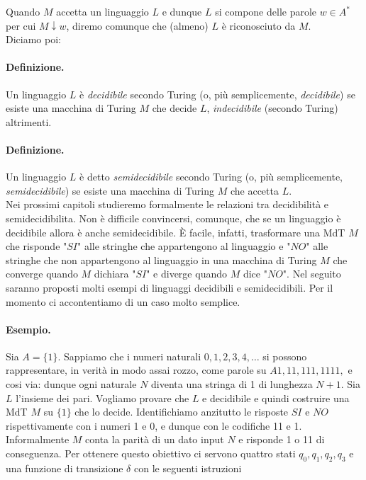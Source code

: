 Quando $M$ accetta un linguaggio $L$ e dunque $L$ si compone delle parole
$w \in A^*$ per cui $M \downarrow w$, diremo comunque che (almeno) $L$ è
riconosciuto da $M$.\\

Diciamo poi:

\paragraph{Definizione.}
Un linguaggio $L$ è \textit{decidibile} secondo Turing
(o, più semplicemente, \textit{decidibile}) se esiste una macchina di Turing $M$ che
decide $L$, \textit{indecidibile} (secondo Turing) altrimenti.

\paragraph{Definizione.}
Un linguaggio $L$ è detto \textit{semidecidibile} secondo Turing
(o, più semplicemente, \textit{semidecidibile}) se esiste una macchina di Turing
$M$ che accetta $L$.\\

Nei prossimi capitoli studieremo formalmente le relazioni tra decidibilità e
semidecidibilita. Non è difficile convincersi, comunque, che se un linguaggio è
decidibile allora è anche semidecidibile. È facile, infatti, trasformare una MdT
$M$ che risponde "$SI$" alle stringhe che appartengono al linguaggio e
"$NO$" alle stringhe che non appartengono al linguaggio in una macchina di Turing
$M$ che converge quando $M$ dichiara "$SI$" e diverge quando $M$ dice "$NO$".
Nel seguito saranno proposti molti esempi di linguaggi decidibili e semidecidibili.
Per il momento ci accontentiamo di un caso molto semplice.

\paragraph{Esempio.}
Sia $A = \{1\}$. Sappiamo che i numeri naturali $0,1,2,3,4, \ldots$ si possono
rappresentare, in verità in modo assai rozzo, come parole su $A 1,11,111, 1111,$ e
cosi via: dunque ogni naturale $N$ diventa una stringa di 1 di lunghezza $N+1$.
Sia $L$ l'insieme dei pari. Vogliamo provare che $L$ e decidibile e quindi
costruire una MdT $M$ su $\{1\}$ che lo decide. Identifichiamo anzitutto le risposte
$SI$ e $NO$ rispettivamente con i numeri 1 e 0, e dunque con le codifiche 11 e 1.
Informalmente $M$ conta la parità di un dato input $N$ e risponde 1 o 11 di
conseguenza. Per ottenere questo obiettivo ci servono quattro stati
$q_0, q_1, q_2, q_3$ e una funzione di transizione $\delta$ con le seguenti istruzioni


